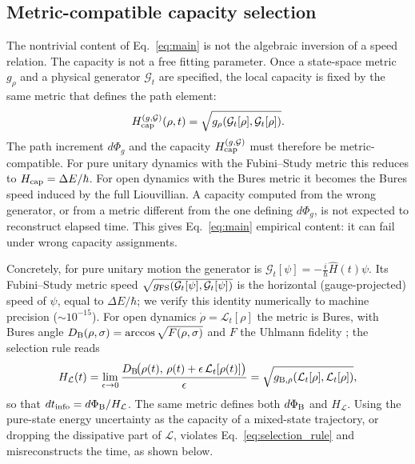 \documentclass[12pt]{article}
\begin{document}
\subsection*{Metric-compatible capacity selection}

The nontrivial content of Eq.~\eqref{eq:main} is not the algebraic inversion of a speed relation. The capacity is not a free fitting parameter. Once a state-space metric \(g_\rho\) and a physical generator \(\mathcal G_t\) are specified, the local capacity is fixed by the same metric that defines the path element:
\begin{equation}
    H_{\rm cap}^{(g,\mathcal G)}(\rho,t)
    =
    \sqrt{
    g_\rho\!\left(\mathcal G_t[\rho],\mathcal G_t[\rho]\right)
    } .
    \label{eq:selection_rule}
\end{equation}
The path increment \(d\Phi_g\) and the capacity \(H_{\rm cap}^{(g,\mathcal G)}\) must therefore be metric-compatible. For pure unitary dynamics with the Fubini--Study metric this reduces to \(H_{\rm cap}=\Delta E/\hbar\). For open dynamics with the Bures metric it becomes the Bures speed induced by the full Liouvillian. A capacity computed from the wrong generator, or from a metric different from the one defining \(d\Phi_g\), is not expected to reconstruct elapsed time. This gives Eq.~\eqref{eq:main} empirical content: it can fail under wrong capacity assignments.

Concretely, for pure unitary motion the generator is \(\mathcal G_t[\psi]=-\tfrac{i}{\hbar}\hat H(t)\psi\). Its Fubini--Study metric speed
\(\sqrt{g_{\rm FS}(\mathcal G_t[\psi],\mathcal G_t[\psi])}\)
is the horizontal (gauge-projected) speed of \(\psi\), equal to \(\Delta E/\hbar\); we verify this identity numerically to machine precision (\(\sim\!10^{-15}\)). For open dynamics \(\dot\rho=\mathcal L_t[\rho]\) the metric is Bures, with Bures angle \(D_{\rm B}(\rho,\sigma)=\arccos\sqrt{F(\rho,\sigma)}\) and \(F\) the Uhlmann fidelity \cite{Uhlmann1976}; the selection rule reads
\begin{equation}
    H_{\mathcal L}(t)=\lim_{\epsilon\to0}\frac{D_{\rm B}\!\big(\rho(t),\,\rho(t)+\epsilon\,\mathcal L_t[\rho(t)]\big)}{\epsilon}
    =\sqrt{g_{\rm B,\rho}(\mathcal L_t[\rho],\mathcal L_t[\rho])},
    \label{eq:HL}
\end{equation}
so that \(dt_{\rm info}=d\Phi_{\rm B}/H_{\mathcal L}\). The same metric defines both \(d\Phi_{\rm B}\) and \(H_{\mathcal L}\). Using the pure-state energy uncertainty as the capacity of a mixed-state trajectory, or dropping the dissipative part of \(\mathcal L\), violates Eq.~\eqref{eq:selection_rule} and misreconstructs the time, as shown below.
\end{document}

